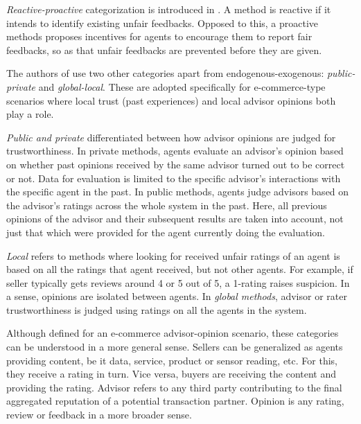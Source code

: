 \documentclass[%
    ]{\PathToTumTemplate/thesis/tum_thesis}
\begin{document}
\emph{Reactive-proactive} categorization is introduced in \cite{thakur_reputation_2019}.
A method is reactive if it intends to identify existing unfair feedbacks.
Opposed to this, a proactive methods proposes incentives for agents to encourage them to report fair feedbacks, so as that unfair feedbacks are prevented before they are given.

The authors of \cite{zhang_detailed_2008} use two other categories apart from endogenous-exogenous: \emph{public-private} and \emph{global-local}.
These are adopted specifically for e-commerce-type scenarios where local trust (past experiences) and local advisor opinions both play a role.

\emph{Public and private} differentiated between how advisor opinions are judged for trustworthiness.
In private methods, agents evaluate an advisor's opinion based on whether past opinions received by the same advisor turned out to be correct or not.
Data for evaluation is limited to the specific advisor's interactions with the specific agent in the past.
In public methods, agents judge advisors based on the advisor's ratings across the whole system in the past.
Here, all previous opinions of the advisor and their subsequent results are taken into account, not just that which were provided for the agent currently doing the evaluation.

\emph{Local} refers to methods where looking for received unfair ratings of an agent is based on all the ratings that agent received, but not other agents.
For example, if seller typically gets reviews around 4 or 5 out of 5, a 1-rating raises suspicion.
In a sense, opinions are isolated between agents.
In \emph{global methods}, advisor or rater trustworthiness is judged using ratings on all the agents in the system.

Although defined for an e-commerce advisor-opinion scenario, these categories can be understood in a more general sense.
Sellers can be generalized as agents providing content, be it data, service, product or sensor reading, etc.
For this, they receive a rating in turn.
Vice versa, buyers are receiving the content and providing the rating.
Advisor refers to any third party contributing to the final aggregated reputation of a potential transaction partner.
Opinion is any rating, review or feedback in a more broader sense.

\end{document}
